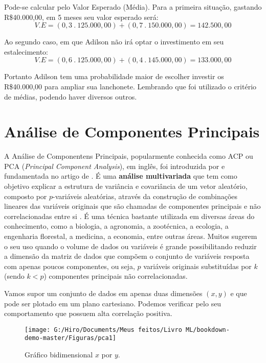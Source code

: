 \documentclass[
]{book}
\begin{document}
Pode-se calcular pelo Valor Esperado (Média). Para a primeira situação, gastando R\$40.000,00, em 5 meses seu valor esperado será:
\[V.E=(0,3\ .\ 125.000,00)+(0,7\ . \ 150.000,00)= 142.500,00\]

Ao segundo caso, em que Adilson não irá optar o investimento em seu estalecimento:
\[V.E=(0,6\ .\ 125.000,00)+(0,4\ . \ 145.000,00)= 133.000,00\]

Portanto Adilson tem uma probabilidade maior de escolher investir os R\$40.000,00 para ampliar sua lanchonete. Lembrando que foi utilizado o critério de médias, podendo haver diversos outros.

\hypertarget{AC}{%
\section{Análise de Componentes Principais}\label{AC}}

A Análise de Componentens Principais, popularmente conhecida como ACP ou PCA (\emph{Principal Component Analysis}), em inglês, foi introduzida por \citet{pearson1901liii} e fundamentada no artigo de \citet{hotelling1933analysis}. É uma \textbf{análise multivariada} que tem como objetivo explicar a estrutura de variância e covariância de um vetor aleatório, composto por \(p\)-variáveis aleatórias, através da construção de combinações lineares das variáveis originais que são chamadas de componentes principais e não correlacionadas entre si \citep{mingoti2007analise}. É uma técnica bastante utilizada em diversas áreas do conhecimento, como a biologia, a agronomia, a zootécnica, a ecologia, a engenharia florestal, a medicina, a economia, entre outras áreas. Muitos sugerem o seu uso quando o volume de dados ou variáveis é grande possibilitando reduzir a dimensão da matriz de dados que compõem o conjunto de variáveis resposta com apenas poucos componentes, ou seja, \(p\) variáveis originais substituídas por \(k\) (sendo \(k < p\)) componentes principais não correlacionadas.

Vamos supor um conjunto de dados em apenas duas dimensões \((x, y)\) e que pode ser plotado em um plano cartesiano. Podemos verificar pelo seu comportamento que possuem alta correlação positiva.

\begin{figure}

{\centering \texttt{[image: G:/Hiro/Documents/Meus feitos/Livro ML/bookdown-demo-master/Figuras/pca1]} 

}

\caption{Gráfico bidimensional \(x\) por \(y\).}\label{fig:pca1}
\end{figure}
\end{document}
